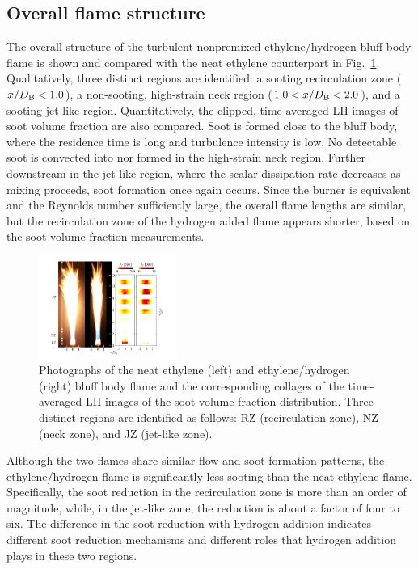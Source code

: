 \documentclass{essci}
\begin{document}
\subsection{Overall flame structure}

The overall structure of the turbulent nonpremixed ethylene/hydrogen bluff body flame is shown and compared with the neat ethylene counterpart in Fig.~\ref{fig:H2_overall}.  Qualitatively, three distinct regions are identified: a sooting recirculation zone ($x/D_{\rm B} < 1.0$), a non-sooting, high-strain neck region ($1.0 < x/D_{\rm B} < 2.0$), and a sooting jet-like region.  Quantitatively, the clipped, time-averaged LII images of soot volume fraction are also compared.  Soot is formed close to the bluff body, where the residence time is long and turbulence intensity is low.  No detectable soot is convected into nor formed in the high-strain neck region.   Further downstream in the jet-like region, where the scalar dissipation rate decreases as mixing proceeds, soot formation once again occurs.  Since the burner is equivalent and the Reynolds number sufficiently large, the overall flame lengths are similar, but the recirculation zone of the hydrogen added flame appears shorter, based on the soot volume fraction measurements.

\begin{figure}[t]
  \centering
  \scriptsize
  \vspace{-0.20in}
  \includegraphics[trim=14mm 5.0mm 14mm 5mm, clip=true, width=0.4\textwidth]{hy_overall_new.png}
  \normalsize
  \vspace{-0.1in}
  \caption{Photographs of the neat ethylene (left) and ethylene/hydrogen (right) bluff body flame and the corresponding collages of the time-averaged LII images of the soot volume fraction distribution.  Three distinct regions are identified as follows: RZ (recirculation zone), NZ (neck zone), and JZ (jet-like zone).}
  \label{fig:H2_overall}
\end{figure}

Although the two flames share similar flow and soot formation patterns, the ethylene/hydrogen flame is significantly less sooting than the neat ethylene flame.  Specifically, the soot reduction in the recirculation zone is more than an order of magnitude, while, in the jet-like zone, the reduction is about a factor of four to six.  The difference in the soot reduction with hydrogen addition indicates different soot reduction mechanisms and different roles that hydrogen addition plays in these two regions.  
\end{document}
